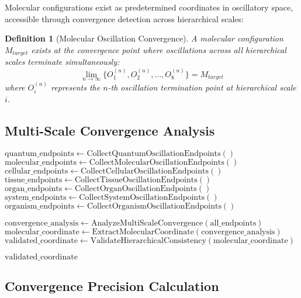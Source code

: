 \documentclass[12pt,a4paper]{article}
\newtheorem{definition}[theorem]{Definition}
\begin{document}
Molecular configurations exist as predetermined coordinates in oscillatory space, accessible through convergence detection across hierarchical scales:

\begin{definition}[Molecular Oscillation Convergence]
A molecular configuration $M_{target}$ exists at the convergence point where oscillations across all hierarchical scales terminate simultaneously:
\begin{equation}
\lim_{n \to \infty} \{O_1^{(n)}, O_2^{(n)}, \ldots, O_8^{(n)}\} = M_{target}
\end{equation}
where $O_i^{(n)}$ represents the $n$-th oscillation termination point at hierarchical scale $i$.
\end{definition}

\subsection{Multi-Scale Convergence Analysis}

\begin{algorithm}
\caption{Molecular Oscillation Convergence Detection}
\begin{algorithmic}[1]
    \State $\text{quantum\_endpoints} \gets \text{CollectQuantumOscillationEndpoints}()$
    \State $\text{molecular\_endpoints} \gets \text{CollectMolecularOscillationEndpoints}()$
    \State $\text{cellular\_endpoints} \gets \text{CollectCellularOscillationEndpoints}()$
    \State $\text{tissue\_endpoints} \gets \text{CollectTissueOscillationEndpoints}()$
    \State $\text{organ\_endpoints} \gets \text{CollectOrganOscillationEndpoints}()$
    \State $\text{system\_endpoints} \gets \text{CollectSystemOscillationEndpoints}()$
    \State $\text{organism\_endpoints} \gets \text{CollectOrganismOscillationEndpoints}()$

    \State $\text{convergence\_analysis} \gets \text{AnalyzeMultiScaleConvergence}(\text{all\_endpoints})$
    \State $\text{molecular\_coordinate} \gets \text{ExtractMolecularCoordinate}(\text{convergence\_analysis})$
    \State $\text{validated\_coordinate} \gets \text{ValidateHierarchicalConsistency}(\text{molecular\_coordinate})$

    \State \Return $\text{validated\_coordinate}$
\EndProcedure
\end{algorithmic}
\end{algorithm}

\subsection{Convergence Precision Calculation}
\end{document}
